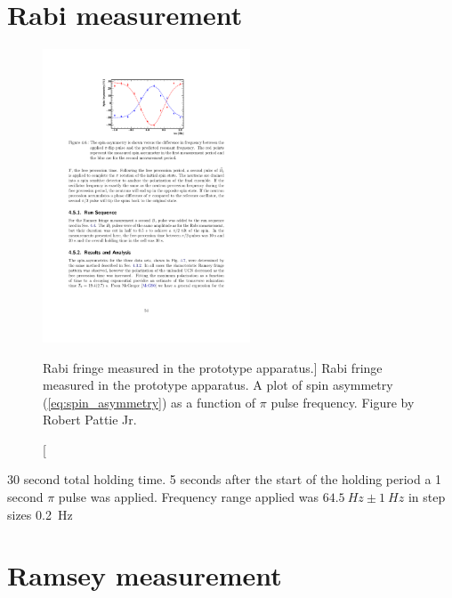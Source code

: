 
\section{Rabi measurement}


\begin{figure}
    \centering
    \includegraphics[width=0.55\textwidth]{figures/2017_rabi_fringe.pdf}
    \caption
    [Rabi fringe measured in the prototype apparatus.]
    {Rabi fringe measured in the prototype apparatus. A plot of spin asymmetry (\ref{eq:spin_asymmetry}) as a function of $\pi$ pulse frequency. Figure by Robert Pattie Jr.}
    \label{fig:rabi_fringe_2017}
\end{figure}

30 second total holding time. 5 seconds after the start of the holding period a 1 second $\pi$ pulse was applied. Frequency range applied was $\qty{64.5}{Hz} \pm \qty{1}{Hz}$ in step sizes \qty{0.2}{Hz}


\section{Ramsey measurement}


